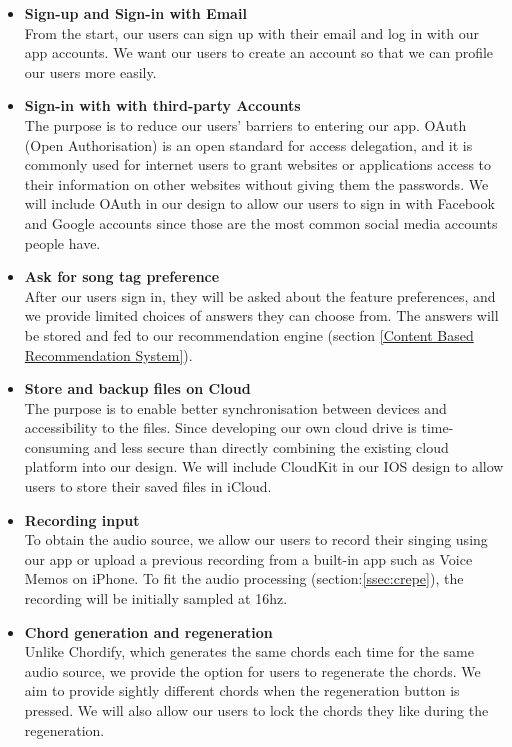 \begin{itemize}

\item \textbf{Sign-up and Sign-in with Email}
\\From the start, our users can sign up with their email and log in with our app accounts. We want our users to create an account so that we can profile our users more easily.

\item \textbf{Sign-in with with third-party Accounts}
\\ The purpose is to reduce our users' barriers to entering our app. OAuth (Open Authorisation) is an open standard for access delegation, and it is commonly used for internet users to grant websites or applications access to their information on other websites without giving them the passwords. We will include OAuth in our design to allow our users to sign in with Facebook and Google accounts since those are the most common social media accounts people have.

\item \textbf{Ask for song tag preference}
\\After our users sign in, they will be asked about the feature preferences, and we provide limited choices of answers they can choose from. The answers will be stored and fed to our recommendation engine (section \ref{Content Based Recommendation System}).

\item \textbf{Store and backup files on Cloud}
\\The purpose is to enable better synchronisation between devices and accessibility to the files. Since developing our own cloud drive is time-consuming and less secure than directly combining the existing cloud platform into our design. 
We will include CloudKit in our IOS design to allow users to store their saved files in iCloud.

\item \textbf{Recording input}
\\ To obtain the audio source, we allow our users to record their singing using our app or upload a previous recording 
from a built-in app such as Voice Memos on iPhone. To fit the audio processing (section:\ref{ssec:crepe}), the recording will be initially sampled at 16hz.

\item \textbf{Chord generation and regeneration}
\\Unlike Chordify, which generates the same chords each time for the same audio source, we provide the option for users to regenerate the chords. We aim to provide sightly different chords when the regeneration button is pressed. 
We will also allow our users to lock the chords they like during the regeneration.


\end{itemize}
